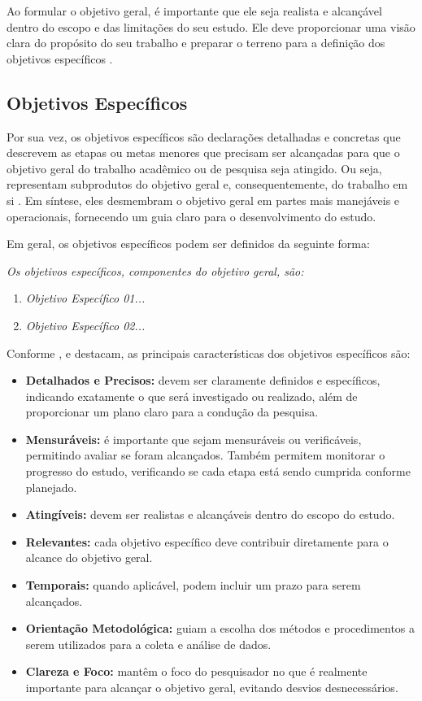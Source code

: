 Ao formular o objetivo geral, é importante que ele seja realista e alcançável dentro do escopo e das limitações do seu estudo. Ele deve proporcionar uma visão clara do propósito do seu trabalho e preparar o terreno para a definição dos objetivos específicos \cite{Marconi2021}.

\subsection{Objetivos Específicos}\label{sec:obj_proj_esp}

Por sua vez, os objetivos específicos são declarações detalhadas e concretas que descrevem as etapas ou metas menores que precisam ser alcançadas para que o objetivo geral do trabalho acadêmico ou de pesquisa seja atingido. Ou seja, representam subprodutos do objetivo geral e, consequentemente, do trabalho em si \cite{Wazlawick2021}. Em síntese, eles desmembram o objetivo geral em partes mais manejáveis e operacionais, fornecendo um guia claro para o desenvolvimento do estudo.

Em geral, os objetivos específicos podem ser definidos da seguinte forma:

\textit{Os objetivos específicos, componentes do objetivo geral, são:}
\begin{enumerate}[label=\textit{\alph*)}, itemsep=0pt, leftmargin=2.5cm]
    \item \textit{Objetivo Específico 01...}
    \item \textit{Objetivo Específico 02...}
\end{enumerate}

Conforme , e  destacam, as principais características dos objetivos específicos são:
\begin{itemize}[itemsep=0pt, leftmargin=2.5cm]
    \item \textbf{Detalhados e Precisos:} devem ser claramente definidos e específicos, indicando exatamente o que será investigado ou realizado, além de proporcionar um plano claro para a condução da pesquisa.
    \item \textbf{Mensuráveis:} é importante que sejam mensuráveis ou verificáveis, permitindo avaliar se foram alcançados. Também permitem monitorar o progresso do estudo, verificando se cada etapa está sendo cumprida conforme planejado.
    \item \textbf{Atingíveis:} devem ser realistas e alcançáveis dentro do escopo do estudo.
    \item \textbf{Relevantes:} cada objetivo específico deve contribuir diretamente para o alcance do objetivo geral.
    \item \textbf{Temporais:} quando aplicável, podem incluir um prazo para serem alcançados.
    \item \textbf{Orientação Metodológica:} guiam a escolha dos métodos e procedimentos a serem utilizados para a coleta e análise de dados.
    \item \textbf{Clareza e Foco:} mantêm o foco do pesquisador no que é realmente importante para alcançar o objetivo geral, evitando desvios desnecessários.
\end{itemize}

